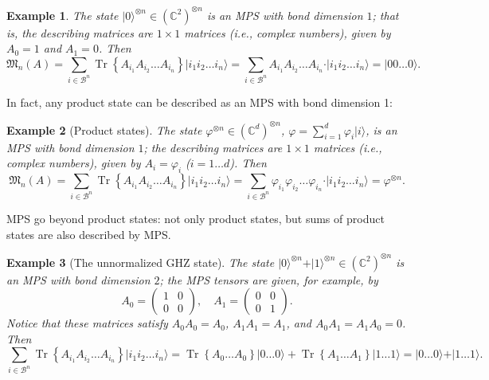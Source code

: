 \documentclass{article}
\newtheorem{example}{Example}
\newcommand{\tr}{\operatorname{Tr}}
\newcommand{\ket}[1]{\vert #1 \rangle}
\begin{document}
\begin{example}
    The state $\ket{0}^{\otimes n} \in (\mathbb{C}^2)^{\otimes n}$ is an MPS with bond dimension $1$; that is, the describing matrices are $1\times 1$ matrices (i.e., complex numbers), given by $A_0 = 1$ and $A_1 = 0$. Then
    \begin{equation*}
      \mathfrak{M}_n(A) = \sum_{i\in \mathcal{B}^n} \tr\left\{A_{i_1} A_{i_2} \dots A_{i_n}\right\} \ket{i_1 i_2 \dots i_n} = \sum_{i\in \mathcal{B}^n} A_{i_1} A_{i_2} \dots A_{i_n}\cdot  \ket{i_1 i_2 \dots i_n}  = \ket{00\dots 0}.
    \end{equation*}
\end{example}
In fact, any product state can be described as an MPS with bond dimension 1:
\begin{example}[Product states]
    The state $\varphi^{\otimes n} \in (\mathbb{C}^d)^{\otimes n}$, $\varphi = \sum_{i=1}^d \varphi_i \ket{i}$, is an MPS with bond dimension $1$; the describing matrices are $1\times 1$ matrices (i.e., complex numbers), given by $A_i = \varphi_i$ ($i=1\dots d$). Then
    \begin{equation*}
      \mathfrak{M}_n(A) = \sum_{i\in \mathcal{B}^n} \tr\left\{A_{i_1} A_{i_2} \dots A_{i_n}\right\} \ket{i_1 i_2 \dots i_n} = \sum_{i\in \mathcal{B}^n} \varphi_{i_1} \varphi_{i_2} \dots \varphi_{i_n}\cdot  \ket{i_1 i_2 \dots i_n}  = \varphi^{\otimes n}.
    \end{equation*}
\end{example}
MPS go beyond product states: not only product states, but sums of product states are also described by MPS. 
\begin{example}[The unnormalized GHZ state]
    The state $\ket{0}^{\otimes n} + \ket{1}^{\otimes n} \in (\mathbb{C}^2)^{\otimes n}$ is an MPS with bond dimension $2$; the MPS tensors are given, for example, by 
    \begin{equation}
        A_0 = \begin{pmatrix} 1 & 0 \\ 0 & 0 \end{pmatrix}, \quad
        A_1 = \begin{pmatrix} 0 & 0 \\ 0 & 1 \end{pmatrix}. 
    \end{equation}
    Notice that these matrices satisfy $A_0 A_0 = A_0$, $A_1A_1 = A_1$, and $A_0A_1 = A_1 A_0 = 0$. Then
    \begin{equation*}
      \sum_{i\in \mathcal{B}^n} \tr\left\{A_{i_1} A_{i_2} \dots A_{i_n}\right\} \ket{i_1 i_2 \dots i_n} = \tr\left\{A_{0} \dots A_{0}\right\} \ket{0 \dots 0} + \tr\left\{A_{1} \dots A_{1}\right\} \ket{1 \dots 1}  = \ket{0 \dots 0} + \ket{1 \dots 1}.
    \end{equation*}
    
\end{example}
\end{document}
